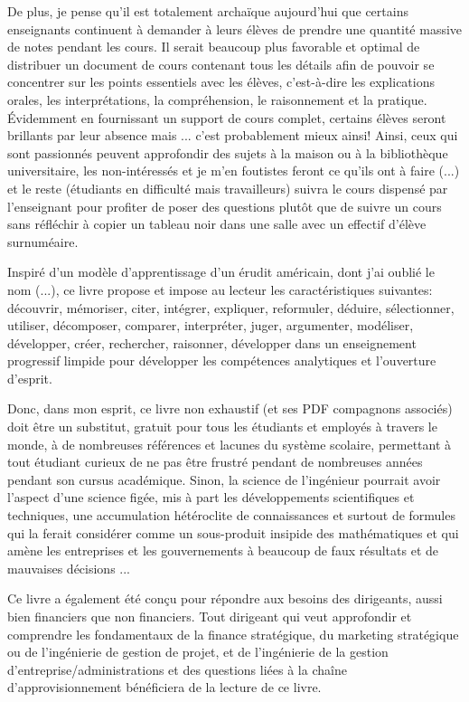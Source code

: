 	De plus, je pense qu'il est totalement archaïque aujourd'hui que certains enseignants continuent à demander à leurs élèves de prendre une quantité massive de notes pendant les cours. Il serait beaucoup plus favorable et optimal de distribuer un document de cours contenant tous les détails afin de pouvoir se concentrer sur les points essentiels avec les élèves, c'est-à-dire les explications orales, les interprétations, la compréhension, le raisonnement et la pratique. Évidemment en fournissant un support de cours complet, certains élèves seront brillants par leur absence mais ... c'est probablement mieux ainsi! Ainsi, ceux qui sont passionnés peuvent approfondir des sujets à la maison ou à la bibliothèque universitaire, les non-intéressés et je m'en foutistes feront ce qu'ils ont à faire (...) et le reste (étudiants en difficulté mais travailleurs) suivra le cours dispensé par l'enseignant pour profiter de poser des questions plutôt que de suivre un cours sans réfléchir à copier un tableau noir dans une salle avec un effectif d'élève surnuméaire.
	
	Inspiré d'un modèle d'apprentissage d'un érudit américain, dont j'ai oublié le nom (...), ce livre propose et impose au lecteur les caractéristiques suivantes: découvrir, mémoriser, citer, intégrer, expliquer, reformuler, déduire, sélectionner, utiliser, décomposer, comparer, interpréter, juger, argumenter, modéliser, développer, créer, rechercher, raisonner, développer dans un  enseignement progressif limpide pour développer les compétences analytiques et l'ouverture d'esprit.

	Donc, dans mon esprit, ce livre non exhaustif (et ses PDF compagnons associés) doit être un substitut, gratuit pour tous les étudiants et employés à travers le monde, à de nombreuses références et lacunes du système scolaire, permettant à tout étudiant curieux de ne pas être frustré pendant de nombreuses années pendant son cursus académique. Sinon, la science de l'ingénieur pourrait avoir l'aspect d'une science figée, mis à part les développements scientifiques et techniques, une accumulation hétéroclite de connaissances et surtout de formules qui la ferait considérer comme un sous-produit insipide des mathématiques et qui amène les entreprises et les gouvernements à beaucoup de faux résultats et de mauvaises décisions ...
	
	Ce livre a également été conçu pour répondre aux besoins des dirigeants, aussi bien financiers que non financiers. Tout dirigeant qui veut approfondir et comprendre les fondamentaux de la finance stratégique, du marketing stratégique ou de l'ingénierie de gestion de projet, et de l'ingénierie de la gestion d'entreprise/administrations et des questions liées à la chaîne d'approvisionnement bénéficiera de la lecture de ce livre.
	

